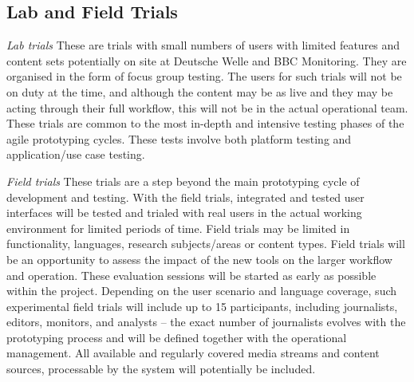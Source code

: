 
\subsection{Lab and Field Trials}

\textit{Lab trials} These are trials with small numbers of users with limited features and content sets potentially on site at Deutsche Welle and BBC Monitoring. They are organised in the form of focus group testing. The users for such trials will not be on duty at the time, and although the content may be as live and they may be acting through their full workflow, this will not be in the actual operational team. These trials are common to the most in-depth and intensive testing phases of the agile prototyping cycles. These tests involve both platform testing and application/use case testing. 

\textit{Field trials} These trials are a step beyond the main prototyping cycle of development and testing. With the field trials, integrated and tested user interfaces will be tested and trialed with real users in the actual working environment for limited periods of time. Field trials may be limited in functionality, languages, research subjects/areas or content types. Field trials will be an opportunity to assess the impact of the new tools on the larger workflow and operation. These evaluation sessions will be started as early as possible within the project. Depending on the user scenario and language coverage, such experimental field trials will include up to 15 participants, including journalists, editors, monitors, and analysts – the exact number of journalists evolves with the prototyping process and will be defined together with the operational management. All available and regularly covered media streams and content sources, processable by the \SUMMA system will potentially be included.


